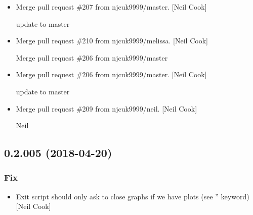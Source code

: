\documentclass[a4paper,10pt,english]{report}
\begin{document}
\begin{itemize}
\item {} 
Merge pull request \#207 from njcuk9999/master. {[}Neil Cook{]}

update to master

\item {} 
Merge pull request \#210 from njcuk9999/melissa. {[}Neil Cook{]}

Merge pull request \#206 from njcuk9999/master

\item {} 
Merge pull request \#206 from njcuk9999/master. {[}Neil Cook{]}

update to master

\item {} 
Merge pull request \#209 from njcuk9999/neil. {[}Neil Cook{]}

Neil

\end{itemize}


\subsection{0.2.005 (2018-04-20)}
\label{\detokenize{misc/changelog:id457}}

\subsubsection{Fix}
\label{\detokenize{misc/changelog:fix}}\begin{itemize}
\item {} 
Exit script should only ask to close graphs if we have plots (see
” keyword) {[}Neil Cook{]}

\end{itemize}
\end{document}
